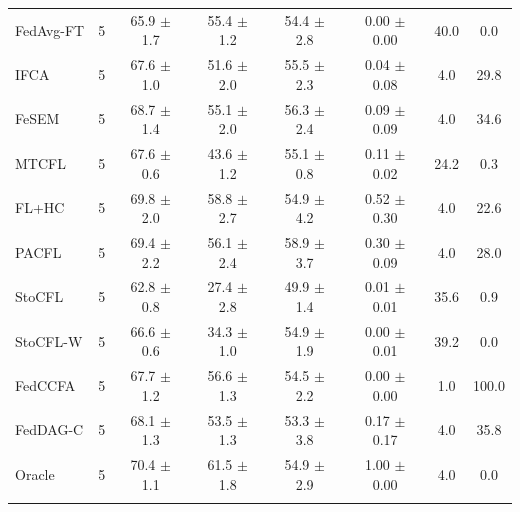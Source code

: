 {\begin{tabular}{l r c c c c c c}
FedAvg-FT & 5 & 65.9 $\pm$ 1.7 & 55.4 $\pm$ 1.2 & 54.4 $\pm$ 2.8 & 0.00 $\pm$ 0.00 & 40.0 & 0.0 \\
IFCA & 5 & 67.6 $\pm$ 1.0 & 51.6 $\pm$ 2.0 & 55.5 $\pm$ 2.3 & 0.04 $\pm$ 0.08 & 4.0 & 29.8 \\
FeSEM & 5 & 68.7 $\pm$ 1.4 & 55.1 $\pm$ 2.0 & 56.3 $\pm$ 2.4 & 0.09 $\pm$ 0.09 & 4.0 & 34.6 \\
MTCFL & 5 & 67.6 $\pm$ 0.6 & 43.6 $\pm$ 1.2 & 55.1 $\pm$ 0.8 & 0.11 $\pm$ 0.02 & 24.2 & 0.3 \\
FL+HC & 5 & 69.8 $\pm$ 2.0 & 58.8 $\pm$ 2.7 & 54.9 $\pm$ 4.2 & 0.52 $\pm$ 0.30 & 4.0 & 22.6 \\
PACFL & 5 & 69.4 $\pm$ 2.2 & 56.1 $\pm$ 2.4 & 58.9 $\pm$ 3.7 & 0.30 $\pm$ 0.09 & 4.0 & 28.0 \\
StoCFL & 5 & 62.8 $\pm$ 0.8 & 27.4 $\pm$ 2.8 & 49.9 $\pm$ 1.4 & 0.01 $\pm$ 0.01 & 35.6 & 0.9 \\
StoCFL-W & 5 & 66.6 $\pm$ 0.6 & 34.3 $\pm$ 1.0 & 54.9 $\pm$ 1.9 & 0.00 $\pm$ 0.01 & 39.2 & 0.0 \\
FedCCFA & 5 & 67.7 $\pm$ 1.2 & 56.6 $\pm$ 1.3 & 54.5 $\pm$ 2.2 & 0.00 $\pm$ 0.00 & 1.0 & 100.0 \\
FedDAG-C & 5 & 68.1 $\pm$ 1.3 & 53.5 $\pm$ 1.3 & 53.3 $\pm$ 3.8 & 0.17 $\pm$ 0.17 & 4.0 & 35.8 \\
Oracle & 5 & 70.4 $\pm$ 1.1 & 61.5 $\pm$ 1.8 & 54.9 $\pm$ 2.9 & 1.00 $\pm$ 0.00 & 4.0 & 0.0 \\
\addlinespace
\bottomrule
\end{tabular}
}

